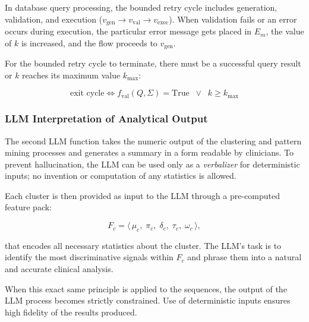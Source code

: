In database query processing, the bounded retry cycle includes generation, validation, and execution ($v_{\mathrm{gen}} \to v_{\mathrm{val}} \to v_{\mathrm{exec}}$). When validation fails or an error occurs during execution, the particular error message gets placed in $E_m$, the value of $k$ is increased, and the flow proceeds to $v_{\mathrm{gen}}$.

For the bounded retry cycle to terminate, there must be a successful query result or $k$ reaches its maximum value $k_{\max}$:

\begin{equation}
    \text{exit cycle} \iff f_{\mathrm{val}}(Q,\Sigma) = \mathrm{True} \;\;\lor\;\; k \ge k_{\max}
    \label{eq:exit}
\end{equation}

\subsubsection*{LLM Interpretation of Analytical Output}

The second LLM function takes the numeric output of the clustering and pattern mining processes and generates a summary in a form readable by clinicians. To prevent hallucination, the LLM can be used only as a \emph{verbalizer} for deterministic inputs; no invention or computation of any statistics is allowed.

Each cluster is then provided as input to the LLM through a pre-computed feature pack:

\begin{equation}
    F_c = \langle\, \mu_c,\; \pi_c,\; \delta_c,\; \tau_c,\; \omega_c \,\rangle,
    \label{eq:feature_pack}
\end{equation}

that encodes all necessary statistics about the cluster. The LLM's task is to identify the most discriminative signals within $F_c$ and phrase them into a natural and accurate clinical analysis.

When this exact same principle is applied to the sequences, the output of the LLM process becomes strictly constrained. Use of deterministic inputs ensures high fidelity of the results produced.

